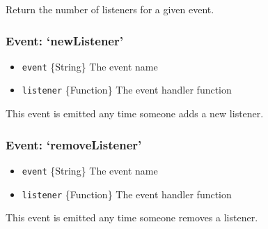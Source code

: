Return the number of listeners for a given event.

\subsubsection{Event: `newListener'}

\begin{itemize}
\item
  \texttt{event} \{String\} The event name
\item
  \texttt{listener} \{Function\} The event handler function
\end{itemize}

This event is emitted any time someone adds a new listener.

\subsubsection{Event: `removeListener'}

\begin{itemize}
\item
  \texttt{event} \{String\} The event name
\item
  \texttt{listener} \{Function\} The event handler function
\end{itemize}

This event is emitted any time someone removes a listener.
